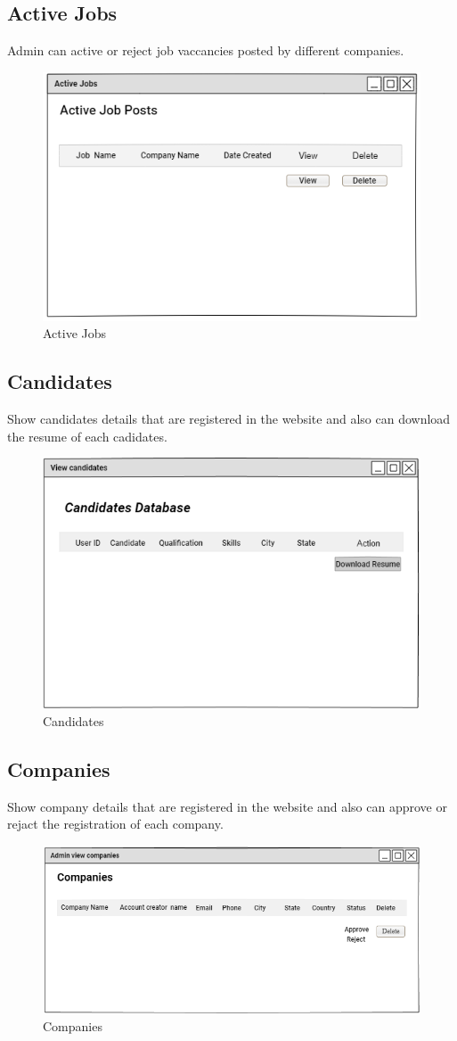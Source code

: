 \documentclass[a4paper,12pt]{report}
\begin{document}
\subsection {Active Jobs}
Admin can active or reject job vaccancies posted by different companies. 
\begin{figure}[bph]
	\centering
	\includegraphics[width=.6\linewidth]{img/admin/adminavtvejobs}
	\caption{Active Jobs}
\end{figure}
\pagebreak
\subsection {Candidates}
Show candidates details that are registered in the website and also can download the resume of each cadidates.
\begin{figure}[bph]
	\centering
	\includegraphics[width=.6\linewidth]{img/admin/adminviewcandidts}
	\caption{Candidates}
\end{figure}

\subsection {Companies}
Show company details that are registered in the website and also can approve or rejact the registration of each company.
\begin{figure}[bph]
	\centering
	\includegraphics[width=.8\linewidth]{img/admin/adminviewcmpny}
	\caption{Companies}
\end{figure}
\pagebreak
\end{document}
